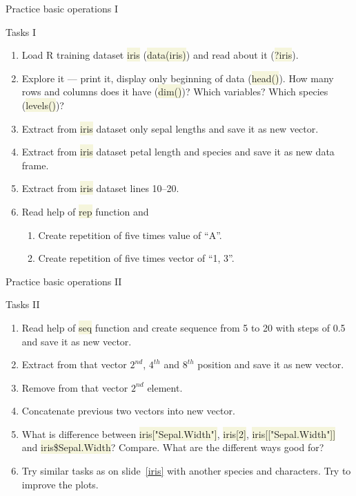 \documentclass[compress, xelatex, 11pt, xcolor=svgnames, aspectratio=169,
	hyperref={
		bookmarks=true,
		unicode=true,
		colorlinks=true,
		pdftitle={Molecular data in R},
		plainpages=false,
		pdfauthor={Vojtech Zeisek},
		pdfsubject={Course about phylogeny and evolution in R},
		pdfcreator={XeLaTeX},
		pdfkeywords={R, evolution, phylogeny, molecular data},
		linkcolor=Crimson, %
		anchorcolor=Magenta, %
		citecolor=Magenta, %
		filecolor=Magenta, %
		menucolor=Magenta, %
		urlcolor=DodgerBlue, %
		},
	url={hyphens, lowtilde} %
	]{beamer}
\renewcommand{\texttt}[1]{\colorbox{Beige}{{\ttfamily #1}}}
\begin{document}
\begin{frame}{Practice basic operations I}
	\begin{exampleblock}{Tasks I}
		\begin{enumerate}
			\item Load R training dataset \texttt{iris} (\texttt{data(iris)}) and read about it (\texttt{?iris}).
			\item Explore it --- print it, display only beginning of data (\texttt{head()}). How many rows and columns does it have (\texttt{dim()})? Which variables? Which species (\texttt{levels()})?
			\item Extract from \texttt{iris} dataset only sepal lengths and save it as new vector.
			\item Extract from \texttt{iris} dataset petal length and species and save it as new data frame.
			\item Extract from \texttt{iris} dataset lines 10--20.
			\item Read help of \texttt{rep} function and
			\begin{enumerate}
				\item Create repetition of five times value of \enquote{A}.
				\item Create repetition of five times vector of \enquote{1, 3}.
			\end{enumerate}
		\end{enumerate}
	\end{exampleblock}
\end{frame}

\begin{frame}{Practice basic operations II}
	\begin{exampleblock}{Tasks II}
		\begin{enumerate}
			\item Read help of \texttt{seq} function and create sequence from 5 to 20 with steps of 0.5 and save it as new vector.
			\item Extract from that vector $2^{nd}$, $4^{th}$ and $8^{th}$ position and save it as new vector.
			\item Remove from that vector $2^{nd}$ element.
			\item Concatenate previous two vectors into new vector.
			\item What is difference between \texttt{iris["Sepal.Width"]}, \texttt{iris[2]}, \texttt{iris[["Sepal.Width"]]} and \texttt{iris\$Sepal.Width}? Compare. What are the different ways good for?
			\item Try similar tasks as on slide~\ref{iris} with another species and characters. Try to improve the plots.
		\end{enumerate}
	\end{exampleblock}
\end{frame}
\end{document}
